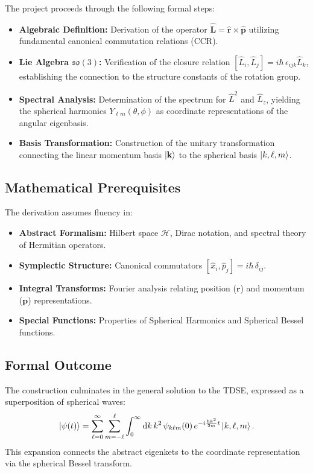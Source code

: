 The project proceeds through the following formal steps:
\begin{itemize}
  \item \textbf{Algebraic Definition:} Derivation of the operator
  $\hat{\mathbf{L}} = \hat{\mathbf{r}} \times \hat{\mathbf{p}}$ utilizing
  fundamental canonical commutation relations (CCR).
  \item \textbf{Lie Algebra $\mathfrak{so}(3)$:} Verification of the closure
  relation $[\hat{L}_i, \hat{L}_j] = i\hbar\, \epsilon_{ijk}\hat{L}_k$,
  establishing the connection to the structure constants of the rotation group.
  \item \textbf{Spectral Analysis:} Determination of the spectrum for
  $\hat{L}^2$ and $\hat{L}_z$, yielding the spherical harmonics
  $Y_{\ell m}(\theta, \phi)$ as coordinate representations of the angular
  eigenbasis.
  \item \textbf{Basis Transformation:} Construction of the unitary
  transformation connecting the linear momentum basis $\ket{\mathbf{k}}$ to the
  spherical basis $\ket{k,\ell,m}$.
\end{itemize}

\subsection{Mathematical Prerequisites}

The derivation assumes fluency in:
\begin{itemize}
  \item \textbf{Abstract Formalism:} Hilbert space $\mathcal{H}$, Dirac
  notation, and spectral theory of Hermitian operators.
  \item \textbf{Symplectic Structure:} Canonical commutators
  $[\hat{x}_i, \hat{p}_j]=i\hbar\,\delta_{ij}$.
  \item \textbf{Integral Transforms:} Fourier analysis relating position
  ($\mathbf{r}$) and momentum ($\mathbf{p}$) representations.
  \item \textbf{Special Functions:} Properties of Spherical Harmonics and
  Spherical Bessel functions.
\end{itemize}

\subsection{Formal Outcome}

The construction culminates in the general solution to the TDSE, expressed as a
superposition of spherical waves:
\begin{equation}
  \ket{\psi(t)} = \sum_{\ell=0}^{\infty} \sum_{m=-\ell}^{\ell} \int_0^\infty
  \mathrm{d}k\, k^2\, \psi_{k\ell m}(0)\, e^{-i \frac{\hbar k^2}{2m} t}
  \ket{k, \ell, m}.
\end{equation}
This expansion connects the abstract eigenkets to the coordinate representation
via the spherical Bessel transform.
